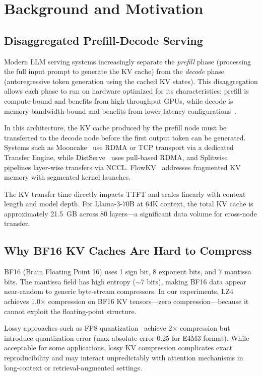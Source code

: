 \section{Background and Motivation}
\label{sec:background}

\subsection{Disaggregated Prefill-Decode Serving}

Modern LLM serving systems increasingly separate the \emph{prefill} phase (processing the full input prompt to generate the KV cache) from the \emph{decode} phase (autoregressive token generation using the cached KV states). This disaggregation allows each phase to run on hardware optimized for its characteristics: prefill is compute-bound and benefits from high-throughput GPUs, while decode is memory-bandwidth-bound and benefits from lower-latency configurations~\cite{distserve,splitwise}.

In this architecture, the KV cache produced by the prefill node must be transferred to the decode node before the first output token can be generated. Systems such as Mooncake~\cite{mooncake} use RDMA or TCP transport via a dedicated Transfer Engine, while DistServe~\cite{distserve} uses pull-based RDMA, and Splitwise~\cite{splitwise} pipelines layer-wise transfers via NCCL. FlowKV~\cite{flowkv} addresses fragmented KV memory with segmented kernel launches.

The KV transfer time directly impacts TTFT and scales linearly with context length and model depth. For Llama-3-70B at 64K context, the total KV cache is approximately 21.5~GB across 80 layers---a significant data volume for cross-node transfer.

\subsection{Why BF16 KV Caches Are Hard to Compress}

BF16 (Brain Floating Point 16) uses 1 sign bit, 8 exponent bits, and 7 mantissa bits. The mantissa field has high entropy ($\sim$7 bits), making BF16 data appear near-random to generic byte-stream compressors. In our experiments, LZ4 achieves 1.0$\times$ compression on BF16 KV tensors---zero compression---because it cannot exploit the floating-point structure.

Lossy approaches such as FP8 quantization~\cite{kivi} achieve 2$\times$ compression but introduce quantization error (max absolute error 0.25 for E4M3 format). While acceptable for some applications, lossy KV compression complicates exact reproducibility and may interact unpredictably with attention mechanisms in long-context or retrieval-augmented settings.

